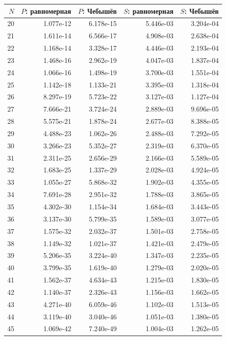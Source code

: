 \documentclass[12pt,a4paper]{article}
\begin{document}
\begingroup\small\renewcommand{\arraystretch}{0.93}
\begin{longtable}{rrrrr}\toprule
$N$ & $P$: равномерная & $P$: Чебышёв & $S$: равномерная & $S$: Чебышёв\\\midrule\endhead
20 & 1.077e-12 & 6.178e-15 & 5.446e-03 & 3.204e-04\\
21 & 1.611e-14 & 6.566e-17 & 4.908e-03 & 2.638e-04\\
22 & 1.168e-14 & 3.328e-17 & 4.446e-03 & 2.193e-04\\
23 & 1.468e-16 & 2.962e-19 & 4.047e-03 & 1.837e-04\\
24 & 1.066e-16 & 1.498e-19 & 3.700e-03 & 1.551e-04\\
25 & 1.142e-18 & 1.133e-21 & 3.395e-03 & 1.318e-04\\
26 & 8.297e-19 & 5.723e-22 & 3.127e-03 & 1.127e-04\\
27 & 7.666e-21 & 3.724e-24 & 2.889e-03 & 9.696e-05\\
28 & 5.575e-21 & 1.878e-24 & 2.677e-03 & 8.388e-05\\
29 & 4.488e-23 & 1.062e-26 & 2.488e-03 & 7.292e-05\\
30 & 3.266e-23 & 5.352e-27 & 2.319e-03 & 6.370e-05\\
31 & 2.311e-25 & 2.656e-29 & 2.166e-03 & 5.589e-05\\
32 & 1.683e-25 & 1.337e-29 & 2.028e-03 & 4.924e-05\\
33 & 1.055e-27 & 5.868e-32 & 1.902e-03 & 4.355e-05\\
34 & 7.691e-28 & 2.951e-32 & 1.788e-03 & 3.865e-05\\
35 & 4.302e-30 & 1.154e-34 & 1.684e-03 & 3.443e-05\\
36 & 3.137e-30 & 5.799e-35 & 1.589e-03 & 3.077e-05\\
37 & 1.575e-32 & 2.032e-37 & 1.501e-03 & 2.758e-05\\
38 & 1.149e-32 & 1.021e-37 & 1.421e-03 & 2.479e-05\\
39 & 5.206e-35 & 3.224e-40 & 1.347e-03 & 2.235e-05\\
40 & 3.799e-35 & 1.619e-40 & 1.279e-03 & 2.020e-05\\
41 & 1.562e-37 & 4.634e-43 & 1.215e-03 & 1.830e-05\\
42 & 1.140e-37 & 2.326e-43 & 1.156e-03 & 1.662e-05\\
43 & 4.271e-40 & 6.059e-46 & 1.102e-03 & 1.513e-05\\
44 & 3.119e-40 & 3.040e-46 & 1.051e-03 & 1.380e-05\\
45 & 1.069e-42 & 7.240e-49 & 1.004e-03 & 1.262e-05\\

\end{longtable}
\end{document}
